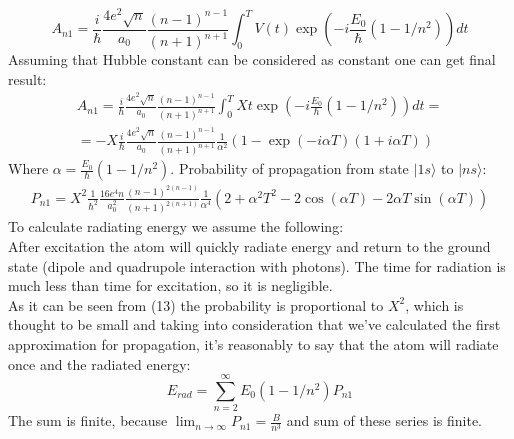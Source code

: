 \documentclass[12pt]{article}
\begin{document}
\begin{equation}
	A_{n1} =  \frac{i}{\hbar}\frac{4e^2\sqrt n}{a_0}\frac{(n-1)^{n-1}}{(n+1)^{n+1}} \int_0^T V(t) \exp(-i\frac{E_0}{\hbar}(1-1/n^2))dt
\end{equation}
Assuming that Hubble constant can be considered as constant one can get final result:
\begin{eqnarray}
	A_{n1} =  \frac{i}{\hbar}\frac{4e^2\sqrt n}{a_0}\frac{(n-1)^{n-1}}{(n+1)^{n+1}} \int_0^T X t \exp(-i\frac{E_0}{\hbar}(1-1/n^2))dt = \nonumber \\
	= -X\frac{i}{\hbar}\frac{4e^2\sqrt n}{a_0}\frac{(n-1)^{n-1}}{(n+1)^{n+1}}\frac{1}{\alpha^2}(1-\exp(-i\alpha T)(1+i\alpha T))
\end{eqnarray}
Where $\alpha = \frac{E_0}{\hbar}(1-1/n^2)$.
Probability of propagation from state $|1s\rangle$ to $|ns\rangle$:
\begin{eqnarray}
P_{n1}=X^2\frac{1}{\hbar^2}\frac{16e^4 n}{a_0^2}\frac{(n-1)^{2(n-1)}}{(n+1)^{2(n+1)}}\frac{1}{\alpha^4}(2+\alpha^2 T^2 -2\cos(\alpha T) -2 \alpha T \sin(\alpha T))
\end{eqnarray}
To calculate radiating energy we assume the following:\\
After excitation the atom will quickly radiate energy and return to the ground state (dipole and quadrupole interaction with photons). The time for radiation is much less than time for excitation, so it is negligible.\\
As it can be seen from (13) the probability is proportional to $X^2$, which is thought to be small and taking into consideration that we've calculated the first approximation for propagation, it's reasonably to say that the atom will radiate once and the radiated energy:
\begin{equation}
	E_{rad} = \sum_{n = 2}^{\infty} E_0(1-1/n^2)P_{n1}
\end{equation}
The sum is finite, because $\lim_{n\longrightarrow \infty}P_{n1} = \frac{B}{n^3}$ and sum of these series is finite.
\end{document}
